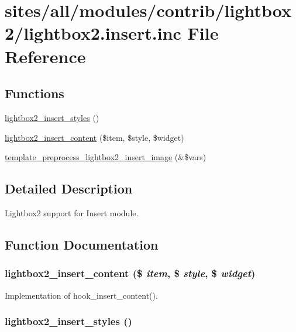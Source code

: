 \hypertarget{lightbox2_8insert_8inc}{
\section{sites/all/modules/contrib/lightbox2/lightbox2.insert.inc File Reference}
\label{lightbox2_8insert_8inc}
}
\subsection*{Functions}
\begin{CompactItemize}
\item 
\hyperlink{lightbox2_8insert_8inc_afe454f1984e07ac69f9346a37e956bf}{lightbox2\_\-insert\_\-styles} ()
\item 
\hyperlink{lightbox2_8insert_8inc_71c828cfe256c23ceeeb1f018766c7b5}{lightbox2\_\-insert\_\-content} (\$item, \$style, \$widget)
\item 
\hyperlink{lightbox2_8insert_8inc_564252d15033d955b2a2f77947a5b1f2}{template\_\-preprocess\_\-lightbox2\_\-insert\_\-image} (\&\$vars)
\end{CompactItemize}


\subsection{Detailed Description}
Lightbox2 support for Insert module. 

\subsection{Function Documentation}
\hypertarget{lightbox2_8insert_8inc_71c828cfe256c23ceeeb1f018766c7b5}{
\subsubsection[{lightbox2\_\-insert\_\-content}]{\setlength{\rightskip}{0pt plus 5cm}lightbox2\_\-insert\_\-content (\$ {\em item}, \/  \$ {\em style}, \/  \$ {\em widget})}}
\label{lightbox2_8insert_8inc_71c828cfe256c23ceeeb1f018766c7b5}


Implementation of hook\_\-insert\_\-content(). \hypertarget{lightbox2_8insert_8inc_afe454f1984e07ac69f9346a37e956bf}{
\subsubsection[{lightbox2\_\-insert\_\-styles}]{\setlength{\rightskip}{0pt plus 5cm}lightbox2\_\-insert\_\-styles ()}}
\label{lightbox2_8insert_8inc_afe454f1984e07ac69f9346a37e956bf}


